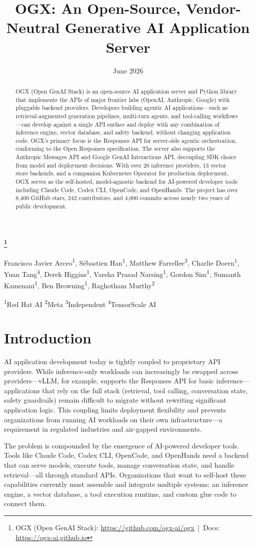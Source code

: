 \documentclass[11pt]{article}
\title{OGX: An Open-Source, Vendor-Neutral Generative AI Application Server}
\author{}
\date{June 2026}
\makeatletter
\renewcommand{\maketitle}{%
  \begin{center}
    {\LARGE\bfseries \@title\footnote{OGX (Open GenAI Stack): \url{https://github.com/ogx-ai/ogx} \,|\, Docs: \url{https://ogx-ai.github.io}} \par}
    \vspace{1em}
    {\large
      Francisco Javier Arceo\textsuperscript{1},
      S\'ebastien Han\textsuperscript{1},
      Matthew Farrellee\textsuperscript{3},
      Charlie Doern\textsuperscript{1},
      Yuan Tang\textsuperscript{4},
      Derek Higgins\textsuperscript{1},
      Varsha Prasad Narsing\textsuperscript{1},
      Gordon Sim\textsuperscript{1},
      Sumanth Kamenani\textsuperscript{1},
      Ben Browning\textsuperscript{1},
      Raghotham Murthy\textsuperscript{2}
      \par}
    \vspace{0.5em}
    {\normalsize \textsuperscript{1}Red Hat AI \quad \textsuperscript{2}Meta \quad \textsuperscript{3}Independent \quad \textsuperscript{4}TensorScale AI \par}
    \vspace{0.5em}
    {\normalsize \@date \par}
  \end{center}
  \vspace{1.5em}
}
\makeatother
\begin{document}
\maketitle

\begin{abstract}
OGX (Open GenAI Stack) is an open-source AI application server and Python library that implements the APIs of major frontier labs (OpenAI, Anthropic, Google) with pluggable backend providers. Developers building agentic AI applications---such as retrieval-augmented generation pipelines, multi-turn agents, and tool-calling workflows---can develop against a single API surface and deploy with any combination of inference engine, vector database, and safety backend, without changing application code. OGX's primary focus is the Responses API for server-side agentic orchestration, conforming to the Open Responses specification. The server also supports the Anthropic Messages API and Google GenAI Interactions API, decoupling SDK choice from model and deployment decisions. With over 20 inference providers, 13 vector store backends, and a companion Kubernetes Operator for production deployment, OGX serves as the self-hosted, model-agnostic backend for AI-powered developer tools including Claude Code, Codex CLI, OpenCode, and OpenHands. The project has over 8,400 GitHub stars, 242 contributors, and 4,000 commits across nearly two years of public development.
\end{abstract}

\section{Introduction}

AI application development today is tightly coupled to proprietary API providers. While inference-only workloads can increasingly be swapped across providers---vLLM, for example, supports the Responses API for basic inference---applications that rely on the full stack (retrieval, tool calling, conversation state, safety guardrails) remain difficult to migrate without rewriting significant application logic. This coupling limits deployment flexibility and prevents organizations from running AI workloads on their own infrastructure---a requirement in regulated industries and air-gapped environments.

The problem is compounded by the emergence of AI-powered developer tools. Tools like Claude Code, Codex CLI, OpenCode, and OpenHands need a backend that can serve models, execute tools, manage conversation state, and handle retrieval---all through standard APIs. Organizations that want to self-host these capabilities currently must assemble and integrate multiple systems: an inference engine, a vector database, a tool execution runtime, and custom glue code to connect them.
\end{document}
